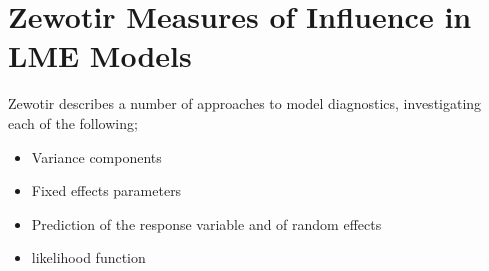\documentclass[12pt, a4paper]{report}
\begin{document}
\section{Zewotir Measures of Influence in LME Models}%
Zewotir describes a number of approaches to model diagnostics, investigating each of the following;
\begin{itemize}
	\item Variance components
	\item Fixed effects parameters
	\item Prediction of the response variable and of random effects
	\item likelihood function
\end{itemize}




\end{document}
